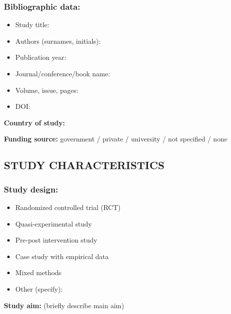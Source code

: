 \documentclass[
hf,
]{ceurart}
\begin{document}
\subsubsection*{Bibliographic data:}
\begin{itemize}
    \item Study title: \underline{\hspace{8cm}}
    \item Authors (surnames, initials): \underline{\hspace{8cm}}
    \item Publication year: \underline{\hspace{3cm}}
    \item Journal/conference/book name: \underline{\hspace{6cm}}
    \item Volume, issue, pages: \underline{\hspace{5cm}}
    \item DOI: \underline{\hspace{5cm}}
\end{itemize}

\noindent\textbf{Country of study:} \underline{\hspace{4cm}}

\noindent\textbf{Funding source:} government / private / university / not specified / none

\subsection*{STUDY CHARACTERISTICS}

\subsubsection*{Study design:}
\begin{itemize}[label=$\square$]
    \item Randomized controlled trial (RCT)
    \item Quasi-experimental study
    \item Pre-post intervention study
    \item Case study with empirical data
    \item Mixed methods
    \item Other (specify): \underline{\hspace{4cm}}
\end{itemize}

\noindent\textbf{Study aim:} (briefly describe main aim)\\
\underline{\hspace{\textwidth}}\\
\underline{\hspace{\textwidth}}
\end{document}

